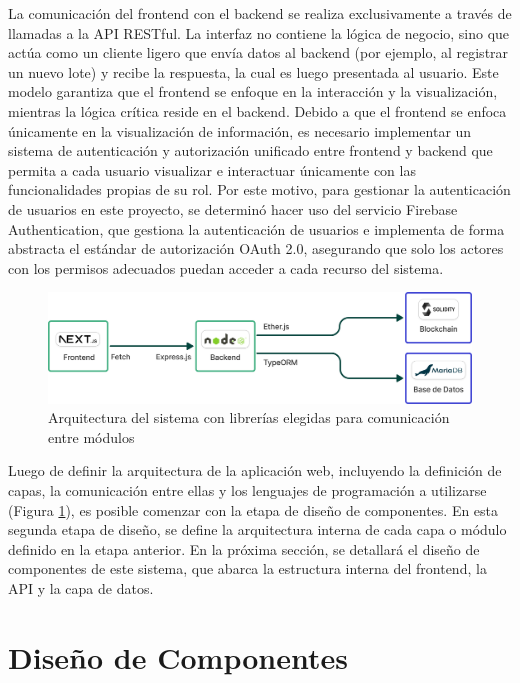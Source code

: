 La comunicación del frontend con el backend se realiza exclusivamente a través de llamadas a la API RESTful. La interfaz no contiene la lógica de negocio, sino que actúa como un cliente ligero que envía datos al backend (por ejemplo, al registrar un nuevo lote) y recibe la respuesta, la cual es luego presentada al usuario. Este modelo garantiza que el frontend se enfoque en la interacción y la visualización, mientras la lógica crítica reside en el backend. Debido a que el frontend se enfoca únicamente en la visualización de información, es necesario implementar un sistema de autenticación y autorización unificado entre frontend y backend que permita a cada usuario visualizar e interactuar únicamente con las funcionalidades propias de su rol. Por este motivo, para gestionar la autenticación de usuarios en este proyecto, se determinó hacer uso del servicio Firebase Authentication, que gestiona la autenticación de usuarios e implementa de forma abstracta el estándar de autorización OAuth 2.0, asegurando que solo los actores con los permisos adecuados puedan acceder a cada recurso del sistema.

\begin{figure}[!htb]
    \centering
    \includegraphics[width=\linewidth]{Figures/system-architecture.png}
    \caption{Arquitectura del sistema con librerías elegidas para comunicación entre módulos}
    \label{fig:system-architecture}
\end{figure}

Luego de definir la arquitectura de la aplicación web, incluyendo la definición de capas, la comunicación entre ellas y los lenguajes de programación a utilizarse (Figura \ref{fig:system-architecture}), es posible comenzar con la etapa de diseño de componentes. En esta segunda etapa de diseño, se define la arquitectura interna de cada capa o módulo definido en la etapa anterior. En la próxima sección, se detallará el diseño de componentes de este sistema, que abarca la estructura interna del frontend, la API y la capa de datos.

\section{Diseño de Componentes}
\label{sec:components-design}

